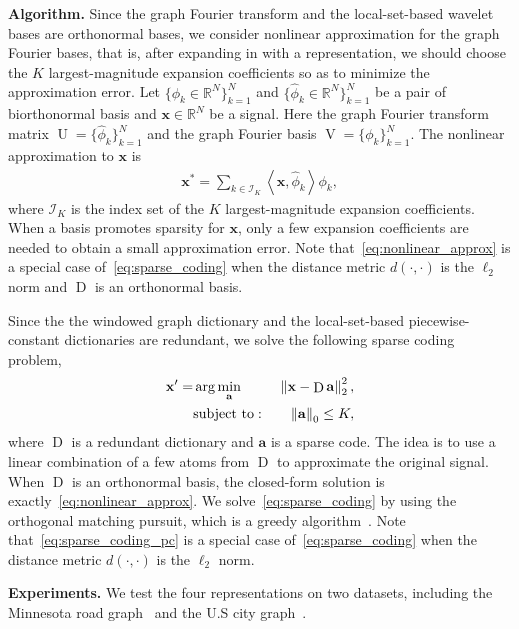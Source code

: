 \documentclass[journal,twocolumn,10pt]{IEEEtran}
\theoremstyle{definition}
\newcommand{\mypar}[1]{{\bf #1.}}
\newcommand{\R}{\ensuremath{\mathbb{R}}}
\def\a{\mathbf{a}}
\def\x{\mathbf{x}}
\DeclareMathOperator{\D}{D}
\DeclareMathOperator{\Vm}{V}
\DeclareMathOperator{\Um}{U}
\begin{document}
\mypar{Algorithm}
Since the graph Fourier transform and the local-set-based wavelet bases are orthonormal bases, we consider nonlinear approximation for the graph Fourier bases, that is, after expanding in with a representation, we should choose the $K$ largest-magnitude expansion coefficients so as to minimize the approximation error. Let $\{ \phi_k \in \R^N \}_{k=1}^N$ and  $\{ \widehat{\phi}_k \in \R^N \}_{k=1}^N$ be a pair of biorthonormal basis and $\x \in  \R^N $ be a signal. Here the graph Fourier transform matrix $\Um = \{ \widehat{\phi}_k \}_{k=1}^N$ and the graph Fourier basis $\Vm = \{ \phi_k \}_{k=1}^N$. The nonlinear approximation to $\x$ is 
\begin{eqnarray}
\label{eq:nonlinear_approx}
   \x^* = \sum_{k \in \mathcal{I}_K} \left\langle {\x, \widehat{\phi}_k} \right\rangle \phi_k,
\end{eqnarray}
where $\mathcal{I}_K$ is the index set of the $K$ largest-magnitude expansion coefficients. When a basis promotes sparsity for $\x$, only a few expansion coefficients are needed to obtain a small approximation error. Note that~\eqref{eq:nonlinear_approx} is a special case of~\eqref{eq:sparse_coding} when the distance metric $d(\cdot, \cdot)$ is the $\ell_2$ norm and $\D$ is an orthonormal basis.


Since the the windowed graph dictionary and the local-set-based piecewise-constant dictionaries are redundant, we solve the following sparse coding problem,
\begin{eqnarray}
\label{eq:sparse_coding_pc}
   \x' =  &  \arg \min_{\a} & \left\| \x - \D \a  \right\|_2^2,
   \\
   \nonumber
   & {\rm subject~to:~} &  \left\| \a \right\|_0 \leq K,
\end{eqnarray}
where $\D$ is a redundant dictionary and $\a$ is a sparse code. The idea is to use a linear combination of a few atoms from $\D$ to approximate the original signal. When $\D$ is an orthonormal basis, the closed-form solution is exactly~\eqref{eq:nonlinear_approx}. We solve~\eqref{eq:sparse_coding} by using the orthogonal matching pursuit, which is a greedy algorithm~\cite{PatiRK:93}. Note that~\eqref{eq:sparse_coding_pc} is a special case of~\eqref{eq:sparse_coding} when the distance metric $d(\cdot, \cdot)$ is the $\ell_2$ norm.

\mypar{Experiments}
We test the four representations on two datasets, including the Minnesota road graph~\cite{MinnesotaGraph} and the U.S city graph~\cite{ChenSMK:14}.
\end{document}
